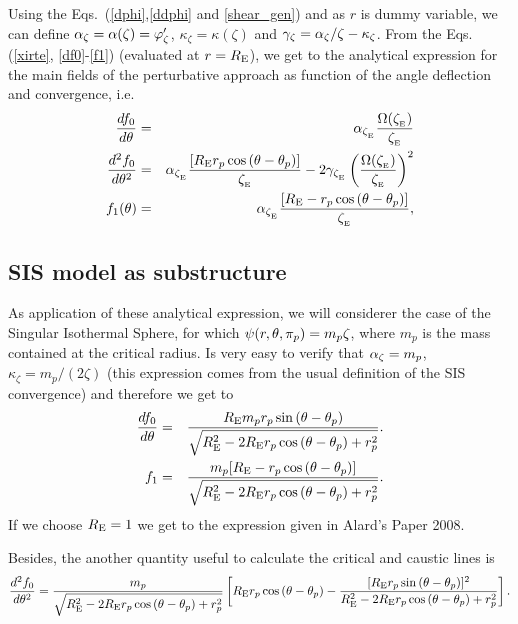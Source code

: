 Using the Eqs.~(\ref{dphi},\ref{ddphi} and \ref{shear_gen}) and as $r$ is dummy variable, we can define 
$\alpha_\zeta=\alpha(\zeta)=\varphi^\prime_\zeta$, $\kappa_\zeta=\kappa(\zeta)$ and $\gamma_\zeta=\alpha_\zeta/\zeta-\kappa_\zeta$. 
From the Eqs.(\ref{xirte}, \ref{df0}-\ref{f1}) (evaluated at $r=R_{\mathrm{E}}$), we get to the analytical expression for the main fields of
the perturbative approach as function of the angle deflection and convergence, i.e.
\begin{eqnarray}
\dfrac{df_0}{d\te}&=&\al_{\xie}\dfrac{\Omega(\xie)}{\xie}\\
\dfrac{d^2f_0}{d\te^2}&=& \al_{\xie}\dfrac{[\re r_p\cos{(\te-\tep)}]}{\xie}%
- 2\gamma_{\xie} \left(\dfrac{\Omega(\xie)}{\xie}\right)^2\\
f_1(\te)&=&\al_{\xie}\dfrac{[\re-r_p\cos{(\te-\tep)}]}{\xie},
\end{eqnarray}

\subsection{SIS model as substructure}

As application of these analytical expression, we will considerer the case of the Singular Isothermal Sphere, for
which $\psi(r,\theta,\pi_p)=m_p\zeta$, where $m_p$ is the mass contained at the critical radius.
Is very easy to verify that $\alpha_\zeta=m_p$,  $\kappa_\zeta=m_p/(2\zeta)$ (this expression comes from the usual
definition of the SIS convergence) and therefore we get to
\begin{eqnarray}
\dfrac{d f_0}{d\theta}&=&\dfrac{R_{\mathrm{E}} m_p r_p \sin{(\theta-\theta_p)}}{\sqrt{R_{\mathrm{E}}^2-2R_{\mathrm{E}} r_p\cos{(\theta-\theta_p)}+r^2_p}}.\\
f_1&=&\dfrac{m_p[R_{\mathrm{E}}-r_p\cos{(\theta-\theta_p)}]}{\sqrt{R_{\mathrm{E}}^2-2R_{\mathrm{E}} r_p\cos{(\theta-\theta_p)}+r^2_p}}.
\end{eqnarray}
If we choose $R_{\mathrm{E}}=1$ we get to the expression given in Alard's Paper 2008.

Besides, the another quantity useful to calculate the critical and caustic lines is
\begin{equation}
\dfrac{d^2 f_0}{d\te^2}=\dfrac{m_p}{\sqrt{\re^2-2\re r_p\cos{(\te-\tep)}+r^2_p}}%
\left[\re r_p\cos{(\te-\tep)}- \dfrac{[\re r_p\sin{(\te-\tep)}]^2}{\re^2-2\re r_p\cos{(\te-\tep)}+r^2_p} \right].
\end{equation}

